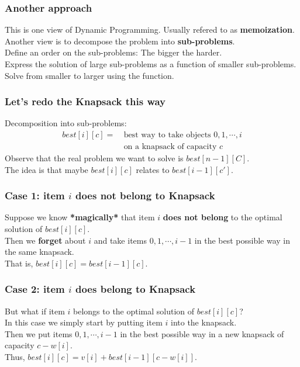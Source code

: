 \documentclass[12pt]{beamer}
\newcommand{\blank}{\vspace{.5cm}}
\begin{document}
\begin{frame}
    \frametitle{Another approach}
    This is one view of Dynamic Programming. Usually refered to as \textbf{memoization}. \\\blank
    Another view is to decompose the problem into \textbf{sub-problems}. \\\blank
    Define an order on the sub-problems: The bigger the harder. \\\blank
    Express the solution of large sub-problems as a function of smaller sub-problems. \\\blank
    Solve from smaller to larger using the function.
\end{frame}

\begin{frame}
    \frametitle{Let's redo the Knapsack this way}
    Decomposition into sub-problems:
    \begin{align*}
        best[i][c] = & \ \text{best way to take objects $0,1,\cdots,i$} \\
        & \ \text{on a knapsack of capacity $c$}
    \end{align*}
    Observe that the real problem we want to solve is $best[n-1][C]$. \\\blank
    The idea is that maybe $best[i][c]$ relates to $best[i-1][c']$.
\end{frame}

\begin{frame}
    \frametitle{Case 1: item $i$ \textbf{does not} belong to Knapsack}
    Suppose we know \textbf{*magically*} that item $i$ \textbf{does not belong} to the optimal solution of $best[i][c]$. \\\blank
    Then we \textbf{forget} about $i$ and take items $0,1,\cdots,i-1$ in the best possible way in the same knapsack. \\\blank
    That is, $best[i][c] = best[i-1][c]$.
\end{frame}

\begin{frame}
    \frametitle{Case 2: item $i$ \textbf{does} belong to Knapsack}
    But what if item $i$ belongs to the optimal solution of $best[i][c]$? \\\blank
    In this case we simply start by putting item $i$ into the knapsack. \\\blank
    Then we put items $0,1,\cdots,i-1$ in the best possible way in a new knapsack of capacity $c - w[i]$. \\\blank
    Thus, $best[i][c] = v[i] + best[i-1][c-w[i]]$. 
\end{frame}
\end{document}
